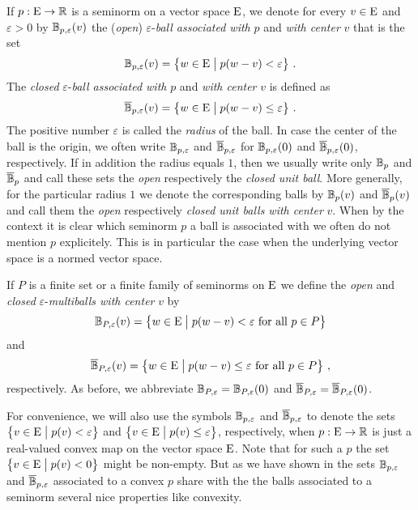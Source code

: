 \begin{definition}
  If $p :\mathrm{E} \to \mathbb{R}$ is a seminorm on a vector space $\mathrm{E}$, we denote for every $v \in \mathrm{E}$
  and $\varepsilon >0$  by $\mathbb{B}_{p,\varepsilon} (v)$   the  (\emph{open}) $\varepsilon$-\emph{ball associated with} $p$ and
  \emph{with center} $v$  that is the set
  \[
    \ball_{p,\varepsilon} (v) = \big\{ w \in \vectorspE \bigmid p(w-v) < \varepsilon \big\} \ .
  \]
  The  \emph{closed} $\varepsilon$-\emph{ball associated with} $p$ and \emph{with center} $v$
  is defined as 
  \[
    \closedball_{p,\varepsilon} (v) = \big\{ w \in \vectorspE \bigmid p(w-v) \leq \varepsilon \big\} \ .
  \]
  The positive number $\varepsilon$ is called the \emph{radius} of the ball.
  In case the center of the ball is the origin, we often write  $\mathbb{B}_{p,\varepsilon}$ and $\overline{\mathbb{B}}_{p,\varepsilon}$
  for $\mathbb{B}_{p,\varepsilon} (0)$ and $\overline{\mathbb{B}}_{p,\varepsilon} (0)$, respectively.
  If in addition the radius equals $1$, then we usually write only
  $\mathbb{B}_{p}$ and $\overline{\mathbb{B}}_{p}$ and call these sets the \emph{open} respectively the
  \emph{closed unit ball}. More generally, for the particular radius $1$ we denote  the corresponding
  balls by $\mathbb{B}_p (v)$ and  $\overline{\mathbb{B}}_p (v)$ and call them the \emph{open} respectively
  \emph{closed}  \emph{unit balls with center} $v$.
  When by the context it is clear which seminorm $p$ a ball is associated with 
  we often do not mention $p$ explicitely. This is in particular the case 
  when the underlying vector space is a normed vector space. 
  
  If $P$ is a finite set or a finite family of seminorms on $\mathrm{E}$ we define the 
  \emph{open} and \emph{closed} $\varepsilon$-\emph{multiballs with center} $v$ by 
  \[
    \mathbb{B}_{P,\varepsilon} (v) =
    \big\{ w \in \mathrm{E}\bigm\vert p(w-v) < \varepsilon \text{ for all } p\in P\big\} 
  \]
  and
   \[
    \overline{\mathbb{B}}_{P,\varepsilon} (v) = \big\{ w \in \mathrm{E} \bigm\vert p(w-v) \leq \varepsilon 
    \text{ for all } p\in P \big\} \ ,
  \]
  respectively. As before, we abbreviate
  $\mathbb{B}_{P,\varepsilon} = \mathbb{B}_{P,\varepsilon} (0)$ and
  $\overline{\mathbb{B}}_{P,\varepsilon} = \overline{\mathbb{B}}_{P,\varepsilon} (0)$. 
\end{definition}

\begin{remark}
  For convenience, we will also use the symbols $\mathbb{B}_{p,\varepsilon}$ and $\overline{\mathbb{B}}_{p,\varepsilon}$
  to denote the sets $\big\{ v \in \mathrm{E} \bigm\vert p(v) < \varepsilon \big\}$
  and $\big\{ v \in \mathrm{E} \bigm\vert p(v) \leq \varepsilon \big\}$, respectively, when $p:\mathrm{E} \to \mathbb{R}$
  is just a real-valued convex map on the vector space $\mathrm{E}$. Note that for such a $p$ the
  set  $\big\{ v \in \mathrm{E} \bigm\vert p(v) < 0 \big\}$ might be non-empty. But as we have shown in
  the sets $\mathbb{B}_{p,\varepsilon}$ and $\overline{\mathbb{B}}_{p,\varepsilon} $ associated to a convex $p$ share with the
  the balls associated to a seminorm several nice properties like convexity. 
\end{remark}


